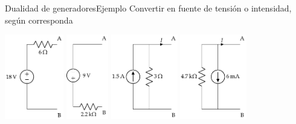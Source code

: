 \documentclass[aspectratio=169, xcolor={usenames,svgnames,dvipsnames}]{beamer}
\begin{document}
\begin{frame}{Dualidad de generadores}{Ejemplo}
Convertir en fuente de tensión o intensidad, según corresponda
    \begin{center}
	        \includegraphics[height=3.7cm]{../figs/Conversion_Fuentes.pdf}\hfil
	        \includegraphics[height=3.7cm]{../figs/Conversion_Fuentes_2.pdf}\hfil
	        \includegraphics[height=3.7cm]{../figs/Conversion_Fuentes_3.pdf}\hfil
	        \includegraphics[height=3.7cm]{../figs/Conversion_Fuentes_4.pdf}
	    \end{center}
\end{frame}
\end{document}
